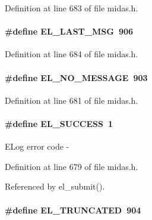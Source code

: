 Definition at line 683 of file midas.h.
\paragraph[{EL\_\-LAST\_\-MSG}]{\setlength{\rightskip}{0pt plus 5cm}\#define EL\_\-LAST\_\-MSG~906}\hfill\label{group__err26_ga5f11d9b4e829e2486252fef634b6a382}

\begin{DoxyItemize}
\item 
\end{DoxyItemize}

Definition at line 684 of file midas.h.
\paragraph[{EL\_\-NO\_\-MESSAGE}]{\setlength{\rightskip}{0pt plus 5cm}\#define EL\_\-NO\_\-MESSAGE~903}\hfill\label{group__err26_ga92e31d92c7267ce163abeda53479cb0a}

\begin{DoxyItemize}
\item 
\end{DoxyItemize}

Definition at line 681 of file midas.h.
\paragraph[{EL\_\-SUCCESS}]{\setlength{\rightskip}{0pt plus 5cm}\#define EL\_\-SUCCESS~1}\hfill\label{group__err26_ga6d87830641fea1e7e72242c32acde1df}
ELog error code -\/ 

Definition at line 679 of file midas.h.

Referenced by el\_\-submit().
\paragraph[{EL\_\-TRUNCATED}]{\setlength{\rightskip}{0pt plus 5cm}\#define EL\_\-TRUNCATED~904}\hfill\label{group__err26_ga3e20cada0b5022911f56eb7c8b29b20b}

\begin{DoxyItemize}
\item 
\end{DoxyItemize}

